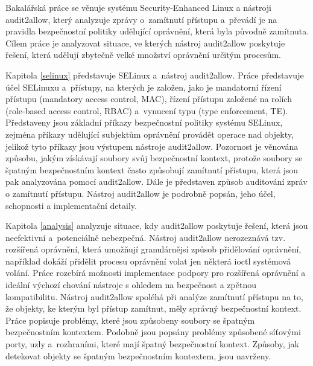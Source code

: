 Bakalářská práce se věnuje systému Security-Enhanced Linux a nástroji
audit2allow, který analyzuje zprávy o~zamítnutí přístupu a~převádí je na
pravidla bezpečnostní politiky udělující oprávnění, která byla původně
zamítnuta. Cílem práce je analyzovat situace, ve kterých nástroj audit2allow
poskytuje řešení, která udělují zbytečně velké množství oprávnění určitým
procesům.

Kapitola \ref{selinux} představuje SELinux a~nástroj audit2allow. Práce
představuje účel SELinuxu a~přístupy, na kterých je založen, jako je mandatorní
řízení přístupu (mandatory access control, MAC), řízení přístupu založené na
rolích (role-based access control, RBAC) a~vynucení typu (type enforcement, TE).
Představeny jsou základní příkazy bezpečnostní politiky systému SELinux, zejména
příkazy udělující subjektům oprávnění provádět operace nad objekty, jelikož tyto
příkazy jsou výstupem nástroje audit2allow. Pozornost je věnována způsobu, jakým
získávají soubory svůj bezpečnostní kontext, protože soubory se špatným
bezpečnostním kontext často způsobují zamítnutí přístupu, která jsou pak
analyzována pomocí audit2allow. Dále je představen způsob auditování zpráv o
zamítnutí přístupu. Nástroj audit2allow je podrobně popsán, jeho účel,
schopnosti a implementační detaily.

Kapitola \ref{analysis} analyzuje situace, kdy audit2allow poskytuje řešení,
která jsou neefektivní a~potenciálně nebezpečná. Nástroj audit2allow nerozeznává
tzv. rozšířená oprávnění, která umožňují granulárnějsí způsob přidělování
oprávnění, například dokáží přidělit procesu oprávnění volat jen některá ioctl
systémová volání. Práce rozebírá možnosti implementace podpory pro rozšířená
oprávnění a ideální výchozí chování nástroje s ohledem na bezpečnost a zpětnou
kompatibilitu.
Nástroj audit2allow spoléhá při analýze zamítnutí přístupu na to, že
objekty, ke kterým byl přístup zamítnut, měly správný bezpečnostní kontext.
Práce popisuje problémy, které jsou způsobeny soubory se špatným bezpečnostním
kontextem. Podobně jsou popsány problémy způsobené síťovými porty, uzly
a~rozhraními, které mají špatný bezpečnostní kontext. Způsoby, jak detekovat
objekty se špatným bezpečnostním kontextem, jsou navrženy.


